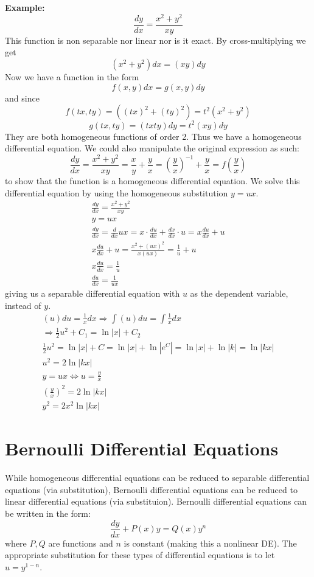 \documentclass[12pt]{article}
\begin{document}
\noindent 
\textbf{Example:} 
\[ 
    \frac{dy}{dx} = \frac{x^2 + y^2}{xy}
\]
This function is non separable nor linear nor is it exact.
By cross-multiplying we get 
\[ 
    (x^2 + y^2)dx = (xy) dy
\]
Now we have a function in the form 
\[ 
    f(x,y) dx = g(x,y) dy 
\]
and since 
\[ 
    f(tx,ty) = ((tx)^2 + (ty)^2) = t^2(x^2 + y^2)   
\]
\[ 
    g(tx,ty) = (txty)dy = t^2(xy)dy 
\]
They are both homogeneous functions of order 2. 
Thus we have a homogeneous differential equation.
We could also manipulate the original expression as such: 
\[ 
    \frac{dy}{dx} = \frac{x^2+y^2}{xy} = \frac{x}{y}+\frac{y}{x} 
    = \left(\frac{y}{x}\right)^{-1} + \frac{y}{x} =
    f\left(\frac{y}{x}\right)
\]
to show that the function is a homogeneous differential equation.
We solve this differential equation by using the homogeneous 
substitution \(y = ux\).
\begin{gather*}
    \frac{dy}{dx} = \frac{x^2 + y^2}{xy} \\
    y = ux \\ 
    \frac{dy}{dx} = \frac{d}{dx}ux = x \cdot \frac{du}{dx} 
    + \frac{dx}{dx} \cdot u =
    x\frac{du}{dx} + u \\ 
    x\frac{du}{dx} + u = \frac{x^2 + (ux)^2}{x(ux)}
    = \frac{1}{u} + u \\ 
    x\frac{du}{dx} = \frac{1}{u} \\ 
    \frac{du}{dx} = \frac{1}{ux}
\end{gather*}
giving us a separable differential equation with \(u\) as the dependent 
variable, instead of \(y\).
\begin{gather*}
    (u)du = \frac{1}{x}dx \Rightarrow \displaystyle\int (u) du 
    = \displaystyle\int \frac{1}{x}dx \\ 
    \Rightarrow \frac{1}{2}u^2 + C_1 = \ln|x|+C_2 \\ 
    \frac{1}{2}u^2 = \ln|x| + C 
    = \ln|x| + \ln|e^C| = \ln|x| + \ln|k| = \ln|kx| \\ 
    u^2 = 2\ln|kx| \\ 
    y = ux \Leftrightarrow u = \frac{y}{x} \\ 
    \left(\frac{y}{x}\right)^2 = 2\ln|kx| \\ 
    y^2 = 2x^2\ln|kx|
\end{gather*}

\break
\section*{Bernoulli Differential Equations}
While homogeneous differential equations can be reduced to separable 
differential equations (via substitution), Bernoulli differential 
equations can be reduced to linear differential equations (via 
substituion).
Bernoulli differential equations can be written in the form:
\[ 
    \frac{dy}{dx} + P(x)y = Q(x)y^n
\]
where \(P,Q\) are functions and \(n\) is constant (making this a 
nonlinear DE).
The appropriate substitution for these types of differential 
equations is to let \(u = y^{1-n}\). 
\end{document}

